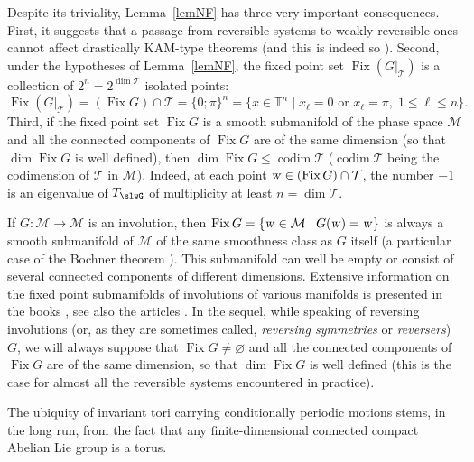 \documentclass[12pt,reqno]{amsart}
\theoremstyle{definition}
\begin{document}
Despite its triviality, Lemma~\ref{lemNF} has three very important
consequences. First, it suggests that a passage from reversible systems to
weakly reversible ones cannot affect drastically KAM-type theorems (and this
is indeed so \cite{AS86,S86,S98}). Second, under the hypotheses of
Lemma~\ref{lemNF}, the fixed point set $\operatorname{Fix}(G|_{\mathcal T})$ is a collection of
$2^n=2^{\dim{\mathcal T}}$ isolated points:
\begin{equation}
\operatorname{Fix}(G|_{\mathcal T}) = (\operatorname{Fix} G)\cap{\mathcal T} = \{0;\pi\}^n =
\{x\in{\mathbb T}^n \mid \text{$x_\ell=0$ or $x_\ell=\pi$}, \; 1{\leqslant}\ell{\leqslant} n\}.
\label{eqFix}
\end{equation}
Third, if the fixed point set $\operatorname{Fix} G$ is a smooth submanifold of the phase
space ${\mathcal M}$ and all the connected components of $\operatorname{Fix} G$ are of the same
dimension (so that $\dim\operatorname{Fix} G$ is well defined), then
$\dim\operatorname{Fix} G{\leqslant}\operatorname{codim}{\mathcal T}$ ($\operatorname{codim}{\mathcal T}$ being the codimension of ${\mathcal T}$ in
${\mathcal M}$). Indeed, at each point ${\text{\textsl{w}}}\in(\operatorname{Fix} G)\cap{\mathcal T}$, the number $-1$ is an
eigenvalue of $T_\slwG$ of multiplicity at least $n=\dim{\mathcal T}$.

If $G:{\mathcal M}\to{\mathcal M}$ is an involution, then
$\operatorname{Fix} G=\{{\text{\textsl{w}}}\in{\mathcal M} \mid G({\text{\textsl{w}}})={\text{\textsl{w}}}\}$ is always a smooth submanifold of
${\mathcal M}$ of the same smoothness class as $G$ itself (a particular case of the
Bochner theorem \cite{Br72,MZ74}). This submanifold can well be empty or
consist of several connected components of different dimensions. Extensive
information on the fixed point submanifolds of involutions of various
manifolds is presented in the books \cite{Br72,CF64}, see also the articles
\cite{QS93,S95RMS,S11}. In the sequel, while speaking of reversing involutions
(or, as they are sometimes called, \emph{reversing symmetries} or
\emph{reversers}) $G$, we will always suppose that $\operatorname{Fix} G\neq\varnothing$ and
all the connected components of $\operatorname{Fix} G$ are of the same dimension, so that
$\dim\operatorname{Fix} G$ is well defined (this is the case for almost all the reversible
systems encountered in practice).

The ubiquity of invariant tori carrying conditionally periodic motions stems,
in the long run, from the fact that any finite-dimensional connected compact
Abelian Lie group is a torus.
\end{document}

